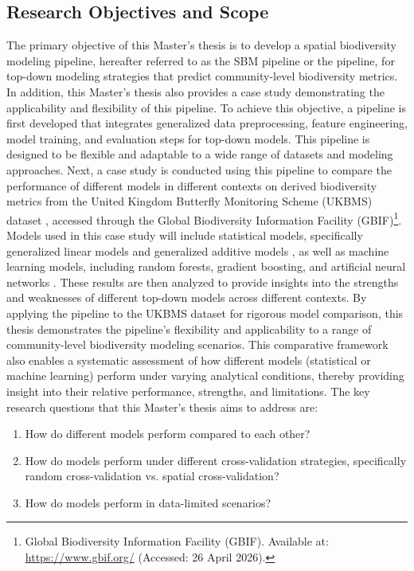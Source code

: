 \subsection{Research Objectives and Scope}\label{sec:research_objectives}

The primary objective of this Master's thesis is to develop a spatial biodiversity modeling pipeline, hereafter referred to as the SBM pipeline or the pipeline, for top-down modeling strategies that predict community-level biodiversity metrics. In addition, this Master's thesis also provides a case study demonstrating the applicability and flexibility of this pipeline. To achieve this objective, a pipeline is first developed that integrates generalized data preprocessing, feature engineering, model training, and evaluation steps for top-down models. This pipeline is designed to be flexible and adaptable to a wide range of datasets and modeling approaches. Next, a case study is conducted using this pipeline to compare the performance of different models in different contexts on derived biodiversity metrics from the United Kingdom Butterfly Monitoring Scheme (UKBMS) dataset \parencite{UKBMS2026}, accessed through the Global Biodiversity Information Facility (GBIF)\footnote{Global Biodiversity Information Facility (GBIF). Available at: \url{https://www.gbif.org/} (Accessed: 26 April 2026).}. Models used in this case study will include statistical models, specifically generalized linear models and generalized additive models \parencite{nelder1972,hastie1986}, as well as machine learning models, including random forests, gradient boosting, and artificial neural networks \parencite{lek1996, Breiman2001RF, friedman2001}. These results are then analyzed to provide insights into the strengths and weaknesses of different top-down models across different contexts. By applying the pipeline to the UKBMS dataset for rigorous model comparison, this thesis demonstrates the pipeline's flexibility and applicability to a range of community-level biodiversity modeling scenarios. This comparative framework also enables a systematic assessment of how different models (statistical or machine learning) perform under varying analytical conditions, thereby providing insight into their relative performance, strengths, and limitations. The key research questions that this Master's thesis aims to address are:

\begin{enumerate}
    \item How do different models perform compared to each other?
    \item How do models perform under different cross-validation strategies, specifically random cross-validation vs. spatial cross-validation?
    \item How do models perform in data-limited scenarios?
\end{enumerate} 

